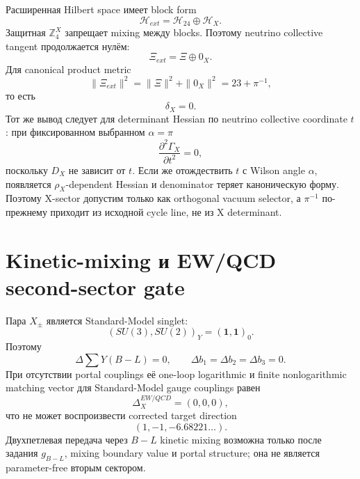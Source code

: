 Расширенная Hilbert space имеет block form
\begin{equation}
 \mathcal H_{ext}=\mathcal H_{24}\oplus\mathcal H_X.
\end{equation}
Защитная \(\mathbb Z_4^X\) запрещает mixing между blocks. Поэтому neutrino
collective tangent продолжается нулём:
\begin{equation}
 \Xi_{ext}=\Xi\oplus0_X.
\end{equation}
Для canonical product metric
\begin{equation}
 \|\Xi_{ext}\|^2
 =\|\Xi\|^2+\|0_X\|^2
 =23+\pi^{-1},
\end{equation}
то есть
\begin{equation}
 \boxed{\delta_X=0.}
\end{equation}
Тот же вывод следует для determinant Hessian по neutrino collective
coordinate \(t\): при фиксированном выбранном \(\alpha=\pi\)
\begin{equation}
 \frac{\partial^2\Gamma_X}{\partial t^2}=0,
\end{equation}
поскольку \(D_X\) не зависит от \(t\). Если же отождествить \(t\) с Wilson
angle \(\alpha\), появляется \(\rho_X\)-dependent Hessian и denominator
теряет каноническую форму. Поэтому X-sector допустим только как orthogonal
vacuum selector, а \(\pi^{-1}\) по-прежнему приходит из исходной cycle line,
не из X determinant.

\section{Kinetic-mixing и EW/QCD second-sector gate}

Пара \(X_\pm\) является Standard-Model singlet:
\begin{equation}
 (SU(3),SU(2))_Y=(\mathbf1,\mathbf1)_0.
\end{equation}
Поэтому
\begin{equation}
 \Delta\sum Y(B-L)=0,
 \qquad
 \Delta b_1=\Delta b_2=\Delta b_3=0.
\end{equation}
При отсутствии portal couplings её one-loop logarithmic и finite
nonlogarithmic matching vector для Standard-Model gauge couplings равен
\begin{equation}
 \Delta_X^{EW/QCD}=(0,0,0),
\end{equation}
что не может воспроизвести corrected target direction
\begin{equation}
 (1,-1,-6.68221\ldots).
\end{equation}
Двухпетлевая передача через \(B-L\) kinetic mixing возможна только после
задания \(g_{B-L}\), mixing boundary value и portal structure; она не
является parameter-free вторым сектором.

